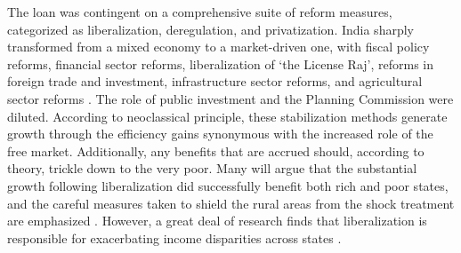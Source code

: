 \documentclass[a4paper, 11pt]{article}
\begin{document}
The loan was contingent on a comprehensive suite of reform measures, categorized as liberalization, deregulation, and privatization.  India sharply transformed from a mixed economy to a market-driven one, with fiscal policy reforms, financial sector reforms, liberalization of ‘the License Raj’, reforms in foreign trade and investment, infrastructure sector reforms, and agricultural sector reforms \citep{ghosh_regional_2012}.  The role of public investment and the Planning Commission were diluted.  According to neoclassical principle, these stabilization methods generate growth through the efficiency gains synonymous with the increased role of the free market.  Additionally, any benefits that are accrued should, according to theory, trickle down to the very poor.  Many will argue that the substantial growth following liberalization did successfully benefit both rich and poor states, and the careful measures taken to shield the rural areas from the shock treatment are emphasized \citep{jha_reducing_2002}.  However, a great deal of research finds that liberalization is responsible for exacerbating income disparities across states \citep{bhattacharya_regional_2004, kar_regional_2006,baddeley_divergence_2006, ghosh_economic_2008,kalra_growth_2010}.  \par
\end{document}
